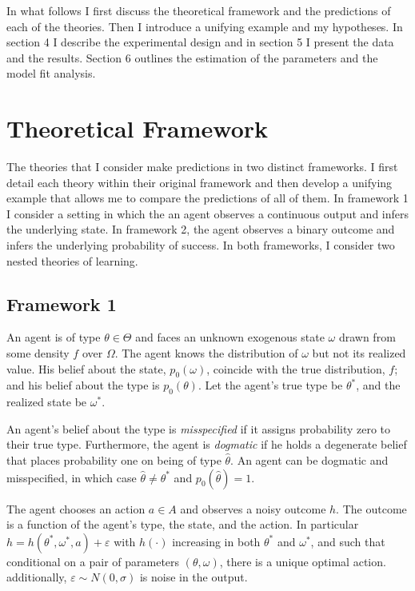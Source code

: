 \documentclass[
  12pt,
]{article}
\begin{document}
In what follows I first discuss the theoretical framework and the
predictions of each of the theories. Then I introduce a unifying example
and my hypotheses. In section 4 I describe the experimental design and
in section 5 I present the data and the results. Section 6 outlines the
estimation of the parameters and the model fit analysis.

\hypertarget{theoretical-framework}{%
\section{Theoretical Framework}\label{theoretical-framework}}

The theories that I consider make predictions in two distinct
frameworks. I first detail each theory within their original framework
and then develop a unifying example that allows me to compare the
predictions of all of them. In framework 1 I consider a setting in which
the an agent observes a continuous output and infers the underlying
state. In framework 2, the agent observes a binary outcome and infers
the underlying probability of success. In both frameworks, I consider
two nested theories of learning.

\hypertarget{framework-1}{%
\subsection{Framework 1}\label{framework-1}}

An agent is of type \(\theta \in \Theta\) and faces an unknown exogenous
state \(\omega\) drawn from some density \(f\) over \(\Omega\). The
agent knows the distribution of \(\omega\) but not its realized value.
His belief about the state, \(p_0(\omega)\), coincide with the true
distribution, \(f\); and his belief about the type is \(p_0(\theta)\).
Let the agent's true type be \(\theta^{*}\), and the realized state be
\(\omega^{*}\).

An agent's belief about the type is \emph{misspecified} if it assigns
probability zero to their true type. Furthermore, the agent is
\emph{dogmatic} if he holds a degenerate belief that places probability
one on being of type \(\hat{\theta}\). An agent can be dogmatic and
misspecified, in which case \(\hat{\theta} \neq \theta^*\) and
\(p_0(\hat{\theta}) = 1\).

The agent chooses an action \(a\in A\) and observes a noisy outcome
\(h\). The outcome is a function of the agent's type, the state, and the
action. In particular \(h = h(\theta^*, \omega^*, a) + \varepsilon\)
with \(h(\cdot)\) increasing in both \(\theta^*\) and \(\omega^*\), and
such that conditional on a pair of parameters \((\theta, \omega)\),
there is a unique optimal action. additionally,
\(\varepsilon\sim N(0, \sigma)\) is noise in the output.
\end{document}

